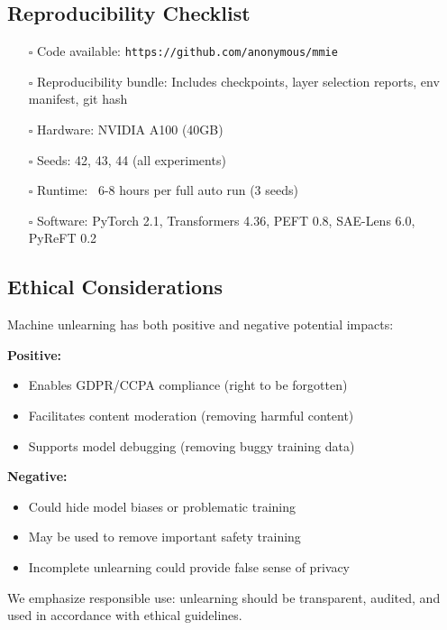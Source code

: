 \documentclass[11pt]{article}
\begin{document}
\subsection{Reproducibility Checklist}

\begin{itemize}
    \item[$\square$] Code available: \texttt{https://github.com/anonymous/mmie}
    \item[$\square$] Reproducibility bundle: Includes checkpoints, layer selection reports, env manifest, git hash
    \item[$\square$] Hardware: NVIDIA A100 (40GB)
    \item[$\square$] Seeds: 42, 43, 44 (all experiments)
    \item[$\square$] Runtime: ~6-8 hours per full auto run (3 seeds)
    \item[$\square$] Software: PyTorch 2.1, Transformers 4.36, PEFT 0.8, SAE-Lens 6.0, PyReFT 0.2
\end{itemize}

\subsection{Ethical Considerations}

Machine unlearning has both positive and negative potential impacts:

\textbf{Positive:}
\begin{itemize}
    \item Enables GDPR/CCPA compliance (right to be forgotten)
    \item Facilitates content moderation (removing harmful content)
    \item Supports model debugging (removing buggy training data)
\end{itemize}

\textbf{Negative:}
\begin{itemize}
    \item Could hide model biases or problematic training
    \item May be used to remove important safety training
    \item Incomplete unlearning could provide false sense of privacy
\end{itemize}

We emphasize responsible use: unlearning should be transparent, audited, and used in accordance with ethical guidelines.
\end{document}
